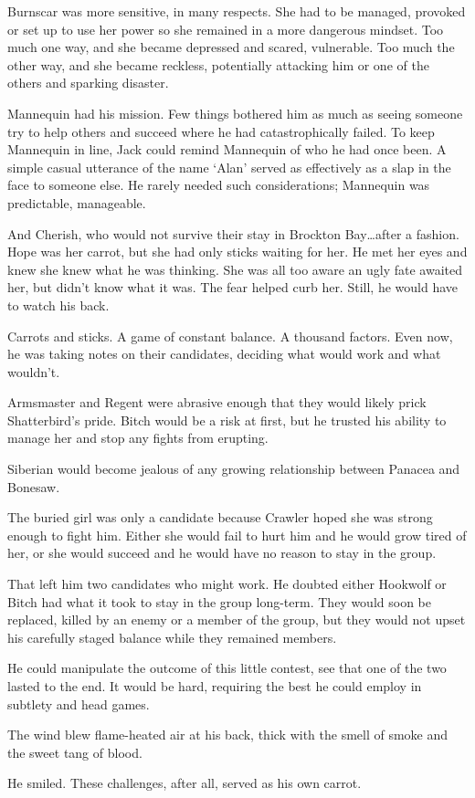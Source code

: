 Burnscar was more sensitive, in many respects.  She had to be managed, provoked or set up to use her power so she remained in a more dangerous mindset.  Too much one way, and she became depressed and scared, vulnerable.  Too much the other way, and she became reckless, potentially attacking him or one of the others and sparking disaster.



Mannequin had his mission.  Few things bothered him as much as seeing someone try to help others and succeed where he had catastrophically failed.  To keep Mannequin in line, Jack could remind Mannequin of who he had once been.  A simple casual utterance of the name `Alan' served as effectively as a slap in the face to someone else.  He rarely needed such considerations; Mannequin was predictable, manageable.



And Cherish, who would not survive their stay in Brockton Bay\ldots after a fashion.  Hope was her carrot, but she had only sticks waiting for her.  He met her eyes and knew she knew what he was thinking.  She was all too aware an ugly fate awaited her, but didn't know what it was.  The fear helped curb her.  Still, he would have to watch his back.



Carrots and sticks.  A game of constant balance.  A thousand factors.  Even now, he was taking notes on their candidates, deciding what would work and what wouldn't.



Armsmaster and Regent were abrasive enough that they would likely prick Shatterbird's pride.  Bitch would be a risk at first, but he trusted his ability to manage her and stop any fights from erupting.



Siberian would become jealous of any growing relationship between Panacea and Bonesaw.



The buried girl was only a candidate because Crawler hoped she was strong enough to fight him.  Either she would fail to hurt him and he would grow tired of her, or she would succeed and he would have no reason to stay in the group.



That left him two candidates who might work.  He doubted either Hookwolf or Bitch had what it took to stay in the group long-term.  They would soon be replaced, killed by an enemy or a member of the group, but they would not upset his carefully staged balance while they remained members.



He could manipulate the outcome of this little contest, see that one of the two lasted to the end.  It would be hard, requiring the best he could employ in subtlety and head games.



The wind blew flame-heated air at his back, thick with the smell of smoke and the sweet tang of blood.



He smiled.  These challenges, after all, served as his own carrot.





